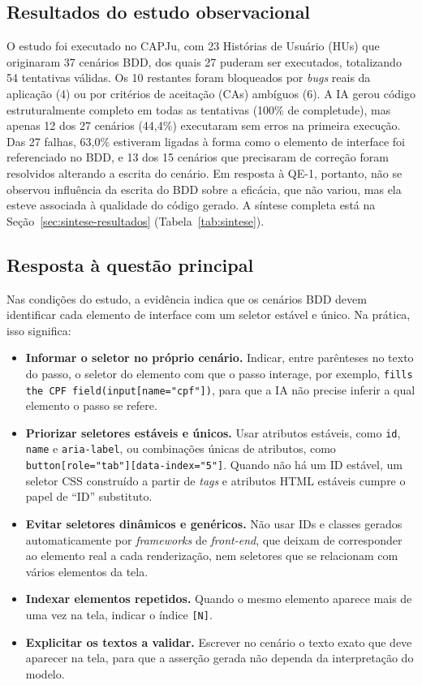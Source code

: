 \subsection{Resultados do estudo observacional}
\label{subsec:resultados-estudo}

O estudo foi executado no CAPJu, com 23 Histórias de Usuário (HUs) que originaram 37 cenários BDD, dos quais 27 puderam ser executados, totalizando 54 tentativas válidas. Os 10 restantes foram bloqueados por \textit{bugs} reais da aplicação (4) ou por critérios de aceitação (CAs) ambíguos (6). A IA gerou código estruturalmente completo em todas as tentativas (100\% de completude), mas apenas 12 dos 27 cenários (44,4\%) executaram sem erros na primeira execução. Das 27 falhas, 63,0\% estiveram ligadas à forma como o elemento de interface foi referenciado no BDD, e 13 dos 15 cenários que precisaram de correção foram resolvidos alterando a escrita do cenário. Em resposta à QE-1, portanto, não se observou influência da escrita do BDD sobre a eficácia, que não variou, mas ela esteve associada à qualidade do código gerado. A síntese completa está na Seção~\ref{sec:sintese-resultados} (Tabela~\ref{tab:sintese}).

\subsection{Resposta à questão principal}
\label{subsec:resposta-qp}

Nas condições do estudo, a evidência indica que os cenários BDD devem identificar cada elemento de interface com um seletor estável e único. Na prática, isso significa:

\begin{itemize}
    \item \textbf{Informar o seletor no próprio cenário.} Indicar, entre parênteses no texto do passo, o seletor do elemento com que o passo interage, por exemplo, \texttt{fills the CPF field(input[name="cpf"])}, para que a IA não precise inferir a qual elemento o passo se refere.
    \item \textbf{Priorizar seletores estáveis e únicos.} Usar atributos estáveis, como \texttt{id}, \texttt{name} e \texttt{aria-label}, ou combinações únicas de atributos, como \texttt{button[role="tab"]}\allowbreak\texttt{[data-index="5"]}. Quando não há um ID estável, um seletor CSS construído a partir de \textit{tags} e atributos HTML estáveis cumpre o papel de ``ID'' substituto.
    \item \textbf{Evitar seletores dinâmicos e genéricos.} Não usar IDs e classes gerados automaticamente por \textit{frameworks} de \textit{front-end}, que deixam de corresponder ao elemento real a cada renderização, nem seletores que se relacionam com vários elementos da tela.
    \item \textbf{Indexar elementos repetidos.} Quando o mesmo elemento aparece mais de uma vez na tela, indicar o índice \texttt{[N]}.
    \item \textbf{Explicitar os textos a validar.} Escrever no cenário o texto exato que deve aparecer na tela, para que a asserção gerada não dependa da interpretação do modelo.
\end{itemize}

